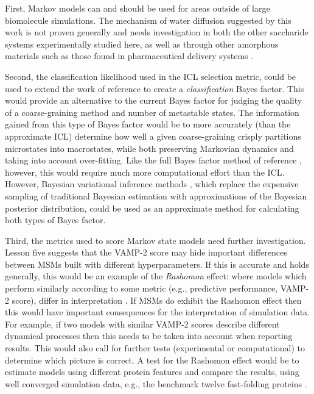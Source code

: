 First, Markov models can and should be used for areas outside of large biomolecule simulations. The mechanism of water diffusion suggested by this work is not proven generally and needs investigation in both the other saccharide systems experimentally studied here, as well as through other amorphous materials such as those found in pharmaceutical delivery systems \cite{hancockCharacteristicsSignificanceAmorphous1997}. 

Second, the classification likelihood used in the ICL selection metric, could be used to extend the work of reference \cite{bacalladoBayesianComparisonMarkov2009a} to create a \emph{classification} Bayes factor. This would provide an alternative to the current Bayes factor for judging the quality of a coarse-graining method and number of metastable states. The information gained from this type of Bayes factor would be to more accurately (than the approximate ICL) determine how well a given coarse-graining crisply partitions microstates into macrostates, while both preserving Markovian dynamics and taking into account over-fitting.  Like the full Bayes factor method of reference \cite{bacalladoBayesianComparisonMarkov2009a}, however, this would require much more computational effort than the ICL. However, Bayesian variational inference methods \cite{foxTutorialVariationalBayesian2012a}, which replace the expensive sampling of traditional Bayesian estimation with approximations of the Bayesian posterior distribution, could be used as an approximate method for calculating both types of Bayes factor. 

Third, the metrics used to score Markov state models need further investigation.  Lesson five suggests that the VAMP-2 score may hide important differences between MSMs built with different hyperparameters. If this is accurate and holds generally, this would be an example of the \emph{Rashomon} effect: where models which perform similarly according to some metric (e.g., predictive performance, VAMP-2 score), differ in interpretation \cite{breiman2001}. If MSMs do exhibit the Rashomon effect then this would have important consequences for the interpretation of simulation data.  For example, if two models with similar VAMP-2 scores describe different dynamical processes then this needs to be taken into account when reporting results. This would also call for further tests (experimental or computational) to determine which picture is correct.  A test for the Rashomon effect would be to estimate models using different protein features and compare the results, using well converged simulation data, e.g., the benchmark twelve fast-folding proteins \cite{lindorff-larsenHowFastFoldingProteins2011a}. 

